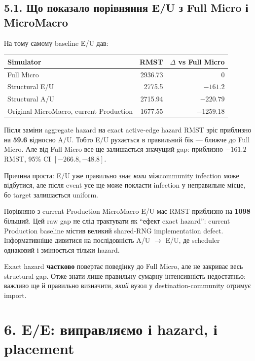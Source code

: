 \documentclass[11pt,a4paper]{article}
\begin{document}
\subsection*{5.1. Що показало порівняння E/U з Full Micro і MicroMacro}

На тому самому baseline E/U дав:

\begin{center}
\begin{tabular}{l r r}
\toprule
\textbf{Simulator} & \textbf{RMST} & \textbf{$\Delta$ vs Full Micro}\\
\midrule
Full Micro & 2936.73 & 0\\
Structural E/U & 2775.5 & $-161.2$\\
Structural A/U & 2715.94 & $-220.79$\\
Original MicroMacro, current Production & 1677.55 & $-1259.18$\\
\bottomrule
\end{tabular}
\end{center}

Після заміни aggregate hazard на exact active-edge hazard RMST зріс приблизно на \textbf{59.6} відносно A/U. Тобто E/U рухається в правильний бік --- ближче до Full Micro. Але від Full Micro все ще залишається значущий gap: приблизно $-161.2$ RMST, 95\% CI $[-266.8,-48.8]$.

Причина проста: E/U уже правильно знає \textit{коли} міжcommunity infection може відбутися, але після event усе ще може покласти infection у неправильне місце, бо target залишається uniform.

Порівняно з current Production MicroMacro E/U має RMST приблизно на \textbf{1098} більший. Цей raw gap не слід трактувати як ``ефект exact hazard'': current Production baseline містив великий shared-RNG implementation defect. Інформативніше дивитися на послідовність A/U $\to$ E/U, де scheduler однаковий і змінюється тільки hazard.

\begin{tcolorbox}[colback=soft,colframe=purple,title=Головний результат E/U]
Exact hazard \textbf{частково} повертає поведінку до Full Micro, але не закриває весь structural gap. Отже знати лише правильну сумарну інтенсивність недостатньо: важливо ще й правильно визначити, \textit{який} вузол у destination-community отримує import.
\end{tcolorbox}

\section*{6. E/E: виправляємо і hazard, і placement}
\end{document}
